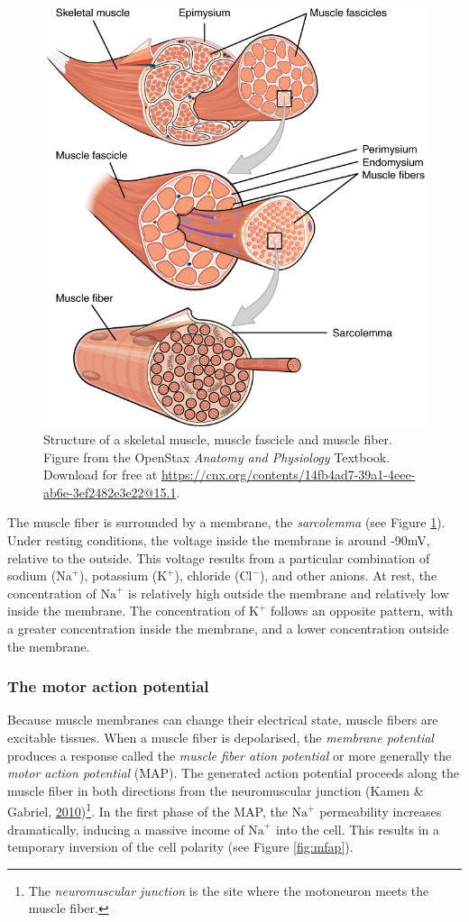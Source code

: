 \documentclass[a4paper,12pt,twoside,openright,oldfontcommands]{memoir}
\let\rmarkdownfootnote\footnote%
\def\footnote{\protect\rmarkdownfootnote}
\begin{document}
\begin{figure}

{\centering \includegraphics[width=0.5\linewidth]{assets/muscle} 

}

\caption{Structure of a skeletal muscle, muscle fascicle and muscle fiber. Figure from the OpenStax \textit{Anatomy and Physiology} Textbook. Download for free at \url{https://cnx.org/contents/14fb4ad7-39a1-4eee-ab6e-3ef2482e3e22@15.1}.}\label{fig:muscle}
\end{figure}

The muscle fiber is surrounded by a membrane, the \emph{sarcolemma} (see Figure \ref{fig:muscle}). Under resting conditions, the voltage inside the membrane is around -90mV, relative to the outside. This voltage results from a particular combination of sodium (\(\text{Na}^{+}\)), potassium (\(\text{K}^{+}\)), chloride (\(\text{Cl}^{-}\)), and other anions. At rest, the concentration of \(\text{Na}^{+}\) is relatively high outside the membrane and relatively low inside the membrane. The concentration of \(\text{K}^{+}\) follows an opposite pattern, with a greater concentration inside the membrane, and a lower concentration outside the membrane.

\hypertarget{the-motor-action-potential}{%
\subsubsection{The motor action potential}\label{the-motor-action-potential}}

Because muscle membranes can change their electrical state, muscle fibers are excitable tissues. When a muscle fiber is depolarised, the \emph{membrane potential} produces a response called the \emph{muscle fiber ation potential} or more generally the \emph{motor action potential} (MAP). The generated action potential proceeds along the muscle fiber in both directions from the neuromuscular junction (Kamen \& Gabriel, \protect\hyperlink{ref-kamen_essentials_2010}{2010})\footnote{The \emph{neuromuscular junction} is the site where the motoneuron meets the muscle fiber.}. In the first phase of the MAP, the \(\text{Na}^{+}\) permeability increases dramatically, inducing a massive income of \(\text{Na}^{+}\) into the cell. This results in a temporary inversion of the cell polarity (see Figure \ref{fig:mfap}).
\end{document}
